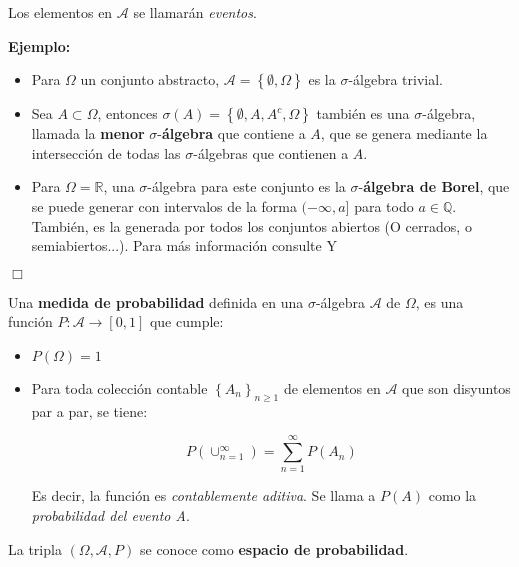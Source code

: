 Los elementos en $\mathcal{A}$ se llamarán \textit{eventos}.



\textbf{Ejemplo:}

\begin{itemize}

	\item Para $\Omega$ un conjunto abstracto, $\mathcal{A} = \left\{ \emptyset, \Omega \right\}$ es la $\sigma$-álgebra trivial. 

	\item Sea $A \subset \Omega$, entonces $\sigma(A) = \left\{ \emptyset, A, A^c, \Omega \right\}$ también es una $\sigma$-álgebra, llamada la \textbf{menor} $\mathbb{\sigma}$-\textbf{álgebra} que contiene a $A$, que se genera mediante la intersección de todas las $\sigma$-álgebras que contienen a $A$. 

	\item Para $\Omega = \mathbb{R}$, una $\sigma$-álgebra para este conjunto es la $\sigma$-\textbf{álgebra de Borel}, que se puede generar con intervalos de la forma $(-\infty, a]$ para todo $a \in \mathbb{Q}$. También, es la generada por todos los conjuntos abiertos (O cerrados, o semiabiertos...). Para más información consulte \cite{Measure_Theory_DC} Y \cite{Probability_Essentials}

\end{itemize}

\begin{flushright}
	$\Box$
\end{flushright}


\begin{boxDef}
	Una \textbf{medida de probabilidad} definida en una $\sigma$-álgebra $\mathcal{A}$ de $\Omega$, es una función $P: \mathcal{A} \rightarrow [0,1]$ que cumple:

	\begin{itemize}
		\item $P(\Omega) =  1$\\
		\item Para toda colección contable $\left\{ A_n \right\}_{n \geq 1}$ de elementos en $\mathcal{A}$ que son disyuntos par a par, se tiene:

		\[
			P\left( \cup_{n=1}^{\infty}  \right) = \sum_{n = 1}^{\infty} P\left( A_n \right)
		\]

		Es decir, la función es \textit{contablemente aditiva}. Se llama a $P(A)$ como la \textit{probabilidad del evento A}.

	\end{itemize}

La tripla $(\Omega, \mathcal{A}, P)$ se conoce como \textbf{espacio de probabilidad}.

\end{boxDef}


